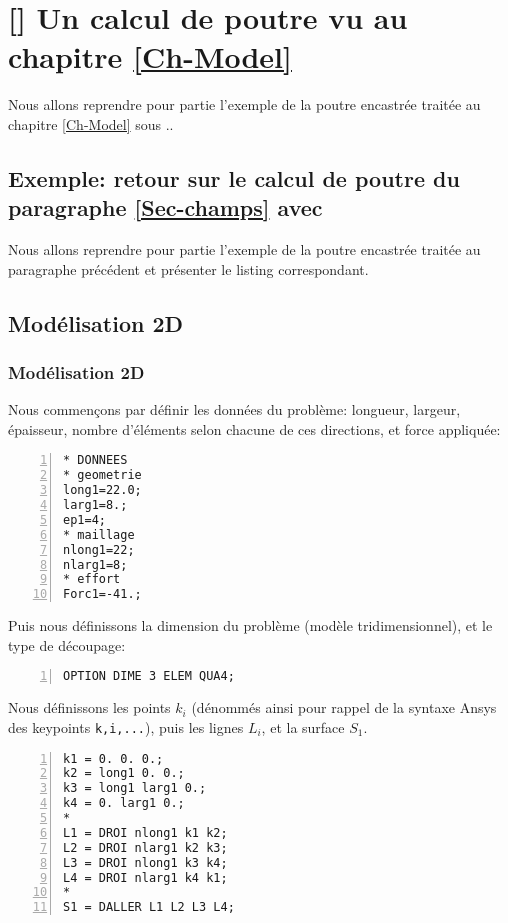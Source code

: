 \ifVersionAvecExemplesSepares
   \chapter{[\castem] Un calcul de poutre vu au chapitre \ref{Ch-Model}}

   Nous allons reprendre pour partie l'exemple de la poutre encastrée traitée au chapitre \ref{Ch-Model} sous \castem..
\else
   \section{Exemple: retour sur le calcul de poutre du paragraphe \ref{Sec-champs} avec \castem}

   Nous allons reprendre pour partie l'exemple de la poutre encastrée traitée au paragraphe précédent et présenter
   le listing \castem correspondant.
\fi



\medskip
\ifVersionAvecExemplesSepares
   \section{Modélisation 2D}
\else
   \subsection{Modélisation 2D}
\fi

Nous commençons par définir les données du problème: longueur, largeur, épaisseur, nombre d'éléments
selon chacune de ces directions, et force appliquée:

\begin{Verbatim}[numbers=left,numbersep=3pt]
* DONNEES
* geometrie
long1=22.0;
larg1=8.;
ep1=4;
* maillage
nlong1=22;
nlarg1=8;
* effort
Forc1=-41.;
\end{Verbatim}

\medskip
Puis nous définissons la dimension du problème (modèle tridimensionnel), et le type de découpage:

\begin{Verbatim}[numbers=left,numbersep=3pt,firstnumber=last]
OPTION DIME 3 ELEM QUA4;
\end{Verbatim}

\medskip
Nous définissons les points $k_i$ (dénommés ainsi pour rappel de la syntaxe Ansys des keypoints \verb|k,i,...|), puis les
lignes $L_i$, et la surface $S_1$.

\begin{Verbatim}[numbers=left,numbersep=3pt,firstnumber=last]
k1 = 0. 0. 0.;
k2 = long1 0. 0.;
k3 = long1 larg1 0.;
k4 = 0. larg1 0.;
*
L1 = DROI nlong1 k1 k2;
L2 = DROI nlarg1 k2 k3;
L3 = DROI nlong1 k3 k4;
L4 = DROI nlarg1 k4 k1;
*
S1 = DALLER L1 L2 L3 L4;
\end{Verbatim}

